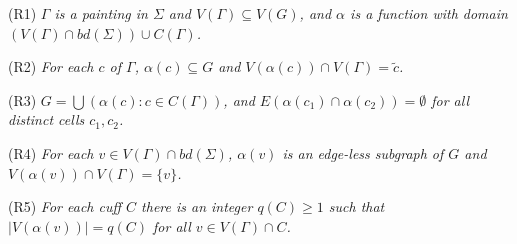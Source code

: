 \hspace*{12pt}(R1) \textit{$\Gamma$ is a painting in $\Sigma$ and $V(\Gamma) \subseteq V(G)$, and $\alpha$ is a function with domain $(V(\Gamma) \cap bd(\Sigma)) \cup C(\Gamma)$.}

\hspace*{12pt}(R2) \textit{For each $c$ of $\Gamma$, $\alpha(c) \subseteq G$ and $V(\alpha(c)) \cap V(\Gamma) = \tilde{c}$.}

\hspace*{12pt}(R3) \textit{$G = \bigcup(\alpha(c) : c \in C(\Gamma))$, and $E(\alpha(c_1) \cap \alpha(c_2)) = \emptyset$ for all distinct cells $c_1, c_2$.}

\hspace*{12pt}(R4) \textit{For each $v \in V(\Gamma) \cap bd(\Sigma)$, $\alpha(v)$ is an edge-less subgraph of $G$ and $V(\alpha(v)) \cap V(\Gamma) = \{v\}$.}

\hspace*{12pt}(R5) \textit{For each cuff $C$ there is an integer $q(C) \ge 1$ such that $|V(\alpha(v))| = q(C)$ for all $v \in V(\Gamma) \cap C$.}
